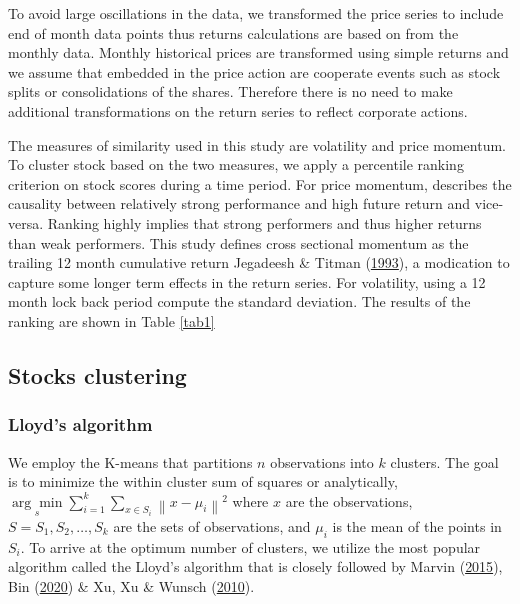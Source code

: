 \documentclass[11pt,preprint, authoryear]{elsarticle}
\numberwithin{equation}{section}
\numberwithin{figure}{section}
\numberwithin{table}{section}
\begin{document}
To avoid large oscillations in the data, we transformed the price series
to include end of month data points thus returns calculations are based
on from the monthly data. Monthly historical prices are transformed
using simple returns and we assume that embedded in the price action are
cooperate events such as stock splits or consolidations of the shares.
Therefore there is no need to make additional transformations on the
return series to reflect corporate actions.

The measures of similarity used in this study are volatility and price
momentum. To cluster stock based on the two measures, we apply a
percentile ranking criterion on stock scores during a time period. For
price momentum, describes the causality between relatively strong
performance and high future return and vice-versa. Ranking highly
implies that strong performers and thus higher returns than weak
performers. This study defines cross sectional momentum as the trailing
12 month cumulative return Jegadeesh \& Titman
(\protect\hyperlink{ref-jegadeesh1993returns}{1993}), a modication to
capture some longer term effects in the return series. For volatility,
using a 12 month lock back period compute the standard deviation. The
results of the ranking are shown in Table \ref{tab1}

\hypertarget{stocks-clustering}{%
\subsection{Stocks clustering}\label{stocks-clustering}}

\hypertarget{lloyds-algorithm}{%
\subsubsection{Lloyd's algorithm}\label{lloyds-algorithm}}

We employ the K-means that partitions \(n\) observations into \(k\)
clusters. The goal is to minimize the within cluster sum of squares or
analytically,
\(\underset{s}{\arg \min } \sum_{i=1}^k \sum_{x \in S_i}\left\|x-\mu_i\right\|^2\)
where \(x\) are the observations, \(S=S_1, S_2, \ldots, S_k\) are the
sets of observations, and \(\mu_i\) is the mean of the points in
\(S_i\). To arrive at the optimum number of clusters, we utilize the
most popular algorithm called the Lloyd's algorithm that is closely
followed by Marvin (\protect\hyperlink{ref-marvin2015creating}{2015}),
Bin (\protect\hyperlink{ref-bin2020k}{2020}) \& Xu, Xu \& Wunsch
(\protect\hyperlink{ref-xu2010clustering}{2010}).
\end{document}
